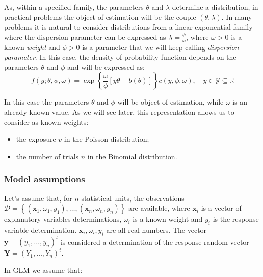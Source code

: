 \documentclass[a4paper, nobind]{templates/ociamthesis}
\providecommand{\tightlist}{%
  \setlength{\itemsep}{0pt}\setlength{\parskip}{0pt}}
\theoremstyle{definition}
\theoremstyle{definition}
\theoremstyle{definition}
\theoremstyle{remark}
\begin{document}
As, within a specified family, the parameters \(\theta\) and \(\lambda\) determine a distribution, in practical problems the object of estimation will be the couple \((\theta, \lambda)\). In many problems it is natural to consider distributions from a linear exponential family where the dispersion parameter can be expressed as \(\lambda = \frac{\phi}{\omega}\), where \(\omega>0\) is a known \emph{weight} and \(\phi>0\) is a parameter that we will keep calling \emph{dispersion parameter}. In this case, the density of probability function depends on the parameters \(\theta\) and \(\phi\) and will be expressed as:
\[
f(y; \theta, \phi, \omega) = \exp{\left\{ \frac{\omega}{\phi} \left[y\theta - b(\theta) \right] \right\}} c(y, \phi, \omega), \quad y\in \mathcal{Y}\subseteq\mathbb{R}
\]

In this case the parameters \(\theta\) and \(\phi\) will be object of estimation, while \(\omega\) is an already known value. As we will see later, this representation allows us to consider as known weights:

\begin{itemize}
\tightlist
\item
  the exposure \(v\) in the Poisson distribution;
\item
  the number of trials \(n\) in the Binomial distribution.
\end{itemize}

\hypertarget{chap:glm-assumptions}{%
\subsubsection{Model assumptions}\label{chap:glm-assumptions}}

Let's assume that, for \(n\) statistical units, the observations \(\mathcal{D} = \left\{ (\boldsymbol{x}_1, \omega_1, y_1), \dots, (\boldsymbol{x}_n, \omega_n, y_n) \right\}\) are available, where \(\boldsymbol{x}_i\) is a vector of explanatory variables determinations, \(\omega_i\) is a known weight and \(y_i\) is the response variable determination. \(\boldsymbol{x}_i, \omega_i, y_i\) are all real numbers. The vector \(\boldsymbol{y} = (y_1, \dots, y_n)^t\) is considered a determination of the response random vector \(\boldsymbol{Y} = (Y_1, \dots, Y_n)^t\).

In GLM we assume that:
\end{document}
